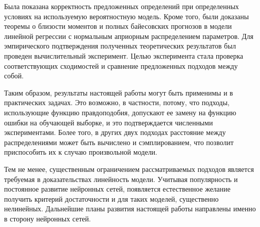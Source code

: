 Была показана корректность предложенных определений при определенных условиях на используемую вероятностную модель. Кроме того, были доказаны теоремы о близости моментов и полных байесовских прогнозов в модели линейной регрессии с нормальным априорным распределением параметров. Для эмпирического подтверждения полученных теоретических результатов был проведен вычислительный эксперимент. Целью эксперимента стала проверка соответствующих сходимостей и сравнение предложенных подходов между собой.

Таким образом, результаты настоящей работы могут быть применимы и в практических задачах. Это возможно, в частности, потому, что подходы, использующие функцию правдоподобия, допускают ее замену на функцию ошибки на обучающей выборке, и это подтверждается численными экспериментами. Более того, в других двух подходах расстояние между распределениями может быть вычислено и сэмплированием, что позволит приспособить их к случаю произвольной модели. 

Тем не менее, существенным ограничением рассматриваемых подходов является требуемая в доказательствах линейность модели. Учитывая популярность и постоянное развитие нейронных сетей, появляется естественное желание получить критерий достаточности и для таких моделей, существенно нелинейных. Дальнейшие планы развития настоящей работы направлены именно в сторону нейронных сетей.